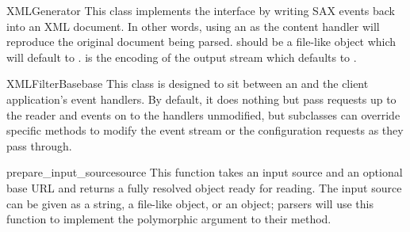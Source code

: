 \begin{classdesc}{XMLGenerator}{}
  This class implements the  interface by
  writing SAX events back into an XML document. In other words, using
  an  as the content handler will reproduce the
  original document being parsed.  should be a file-like
  object which will default to .  is the
  encoding of the output stream which defaults to .
\end{classdesc}

\begin{classdesc}{XMLFilterBase}{base}
  This class is designed to sit between an  and the
  client application's event handlers.  By default, it does nothing
  but pass requests up to the reader and events on to the handlers
  unmodified, but subclasses can override specific methods to modify
  the event stream or the configuration requests as they pass through.
\end{classdesc}

\begin{funcdesc}{prepare_input_source}{source}
  This function takes an input source and an optional base URL and
  returns a fully resolved  object ready for
  reading.  The input source can be given as a string, a file-like
  object, or an  object; parsers will use this
  function to implement the polymorphic  argument to their
   method.
\end{funcdesc}
